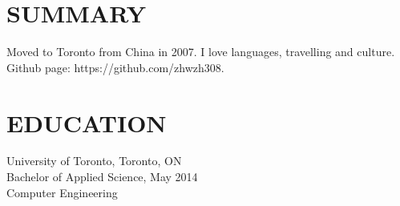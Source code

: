 \documentclass{res}
\begin{document}
 


\address{\bf  Unit 808, 38 Dan Leckie Way\\Toronto, ON M5V 2V6\\(416)
795-0370\\\href{mailto:wenzhong.zhang@mail.utoronto.ca}{wenzhong.zhang@mail.utoronto.ca}}

\begin{resume}

\section{SUMMARY}          
    Moved to Toronto from China in 2007. I love languages, travelling and culture.
    Github page: https://github.com/zhwzh308.
 
\section{EDUCATION}          
    University of Toronto, Toronto, ON  \\        
    Bachelor of Applied Science, May 2014   \\       
    Computer Engineering       \\   
 

\end{resume}
\end{document}
